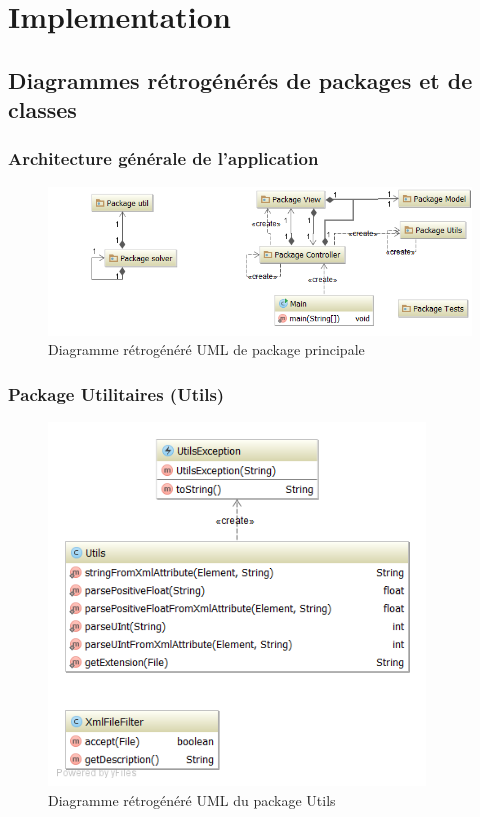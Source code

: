 \chapter{Implementation}


\section{Diagrammes r\'etrog\'en\'er\'es de packages et de classes}

\subsection{Architecture g\'en\'erale de l'application}

\begin{figure}[h]
    \centering
    \includegraphics[width=150mm]{../diagrams/classes_packages/final_classes_packages/packages.png}
    \caption{Diagramme r\'etrog\'en\'er\'e UML de package principale}
    \label{diagram:gen_uml_global}
\end{figure}
\pagebreak

\subsection{Package Utilitaires (Utils)}

\begin{figure}[h]
    \centering
    \includegraphics[width=100mm]{../diagrams/classes_packages/final_classes_packages/utils/package_utils.png}
    \caption{Diagramme r\'etrog\'en\'er\'e UML du package Utils}
    \label{diagram:gen_uml_utils}
\end{figure}
\pagebreak

